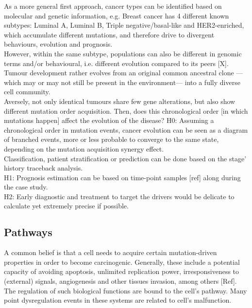 As a more general first approach, cancer types can be identified based on molecular and genetic information, e.g. Breast cancer has 4 different known subtypes: Luminal A, Luminal B, Triple negative/basal-like and HER2-enriched, which accumulate different mutations, and therefore drive to divergent behaviours, evolution and prognosis.
\\

However, within the same subtype, populations can also be different in genomic terms and/or behavioural, i.e. different evolution compared to its peers [X]. Tumour development  rather evolves from an original common ancestral clone —which may or may not still be present in the environment— into a fully diverse cell community.
\\

Aversely, not only identical tumours share few gene alterations, but also show different mutation order acquisition. Then, does this chronological order [in which mutations happen] affect the evolution of the disease?
H0: Assuming a chronological order in mutation events, cancer evolution can be seen as a diagram of branched events, more or less probable to converge to the same state, depending on the mutation acquisition synergy effect.
\\

Classification, patient stratification or prediction can be done based on the stage’ history traceback analysis. 
\\

H1: Prognosis estimation can be based on time-point samples [ref] along during the case study. 
\\

H2: Early diagnostic and treatment to target the drivers would be delicate to calculate yet extremely precise if possible. 
\\

\subsection{Pathways}
A common belief is that a cell needs to acquire certain mutation-driven properties in order to become carcinogenic. Generally, these include a potential capacity of avoiding apoptosis, unlimited replication power, irresponsiveness to (external) signals, angiogenesis and other tissues invasion, among others \cite{Hanahan2011HallmarksGeneration} [Ref]. The regulation of such biological functions are bound to the cell’s pathway. Many point dysregulation events in these systems are related to cell’s malfunction.
\\

